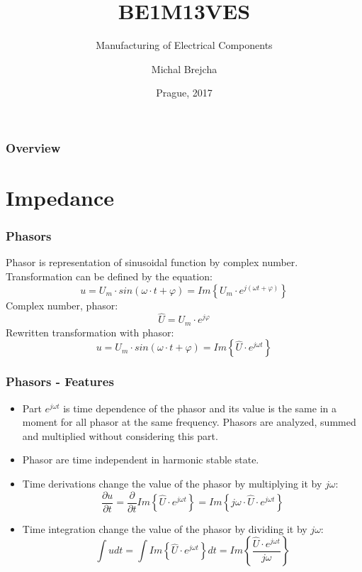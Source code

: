 \documentclass{beamer}
\title[BE1M13VES]{BE1M13VES}
\subtitle[Manufacturing of Electrical Components] {Manufacturing of Electrical Components}
\author[Brejcha]{Michal Brejcha}
\institute[CTU]{CTU in Prague}
\date[Prague, 2017]{Prague, 2017}
\begin{document}
\frame{\titlepage}

\begin{frame}
\frametitle{Overview} 
\tableofcontents
\end{frame}


\section{\texorpdfstring{Impedance}{Impedance}}
	\begin{frame}
    \frametitle{Phasors}
		Phasor is representation of sinusoidal function by complex number. Transformation can be defined by the equation:
		$$u= U_m\cdot sin\left(\omega\cdot t + \varphi\right) = Im\left\{U_m\cdot e^{j\left(\omega t + \varphi\right)}\right\}$$
		Complex number, phasor: $$\hat{U}= U_m\cdot e^{j\varphi}$$
		Rewritten transformation with phasor: $$u= U_m\cdot sin\left(\omega\cdot t + \varphi\right) = Im\left\{\hat{U}\cdot e^{j\omega t}\right\}$$
	\end{frame}
	\begin{frame}
    \frametitle{Phasors - Features}
		
		\begin{itemize}
			\item Part $e^{j\omega t}$ is time dependence of the phasor and its value is the same in a moment for all phasor at the same frequency. Phasors are analyzed, summed and multiplied without considering this part.
			\item Phasor are time independent in harmonic stable state.
			\item Time derivations change the value of the phasor by multiplying it by $j\omega$:
			$$\frac{\partial u}{\partial t} = \frac{\partial}{\partial t}Im\left\{\hat{U}\cdot e^{j\omega t}\right\}=Im\left\{j\omega\cdot\hat{U}\cdot e^{j\omega t}\right\}$$
			\item Time integration change the value of the phasor by dividing it by $j\omega$:
			$$\int u dt = \int Im\left\{\hat{U}\cdot e^{j\omega t}\right\} dt=Im\left\{\frac{\hat{U}\cdot e^{j\omega t}}{j\omega}\right\}$$
		\end{itemize}
	\end{frame}
\end{document}
